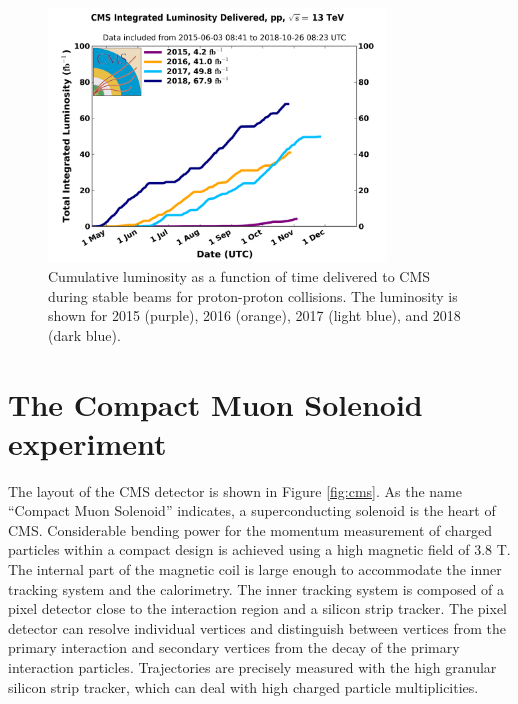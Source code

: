\begin{figure}[htbp]
  \centering
  \includegraphics[width=0.8\textwidth]{plots/chapter3/int_lumi.png}
  \caption{Cumulative luminosity as a function of time delivered to CMS during stable beams for proton-proton collisions. The luminosity is shown for 2015 (purple), 2016 (orange), 2017 (light blue), and 2018 (dark blue). \cite{lumi}}
  \label{fig:lumi}
\end{figure}

\section{The Compact Muon Solenoid experiment}
The layout of the CMS detector is shown in Figure \ref{fig:cms}. As the name ``Compact Muon Solenoid'' indicates, a superconducting solenoid is the heart of CMS. Considerable bending power for the momentum measurement of charged particles within a compact design is achieved using a high magnetic field of 3.8 T. The internal part of the magnetic coil is large enough to accommodate the inner tracking system and the calorimetry. The inner tracking system is composed of a pixel detector close to the interaction region and a silicon strip tracker. The pixel detector can resolve individual vertices and distinguish between vertices from the primary interaction and secondary vertices from the decay of the primary interaction particles. Trajectories are precisely measured with the high granular silicon strip tracker, which can deal with high charged particle multiplicities.

